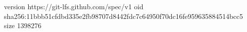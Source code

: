 version https://git-lfs.github.com/spec/v1
oid sha256:11bbb51cfdbd335e2fb98707d8442fdc7c64950f70dc16fe959635884514bcc5
size 1398276
